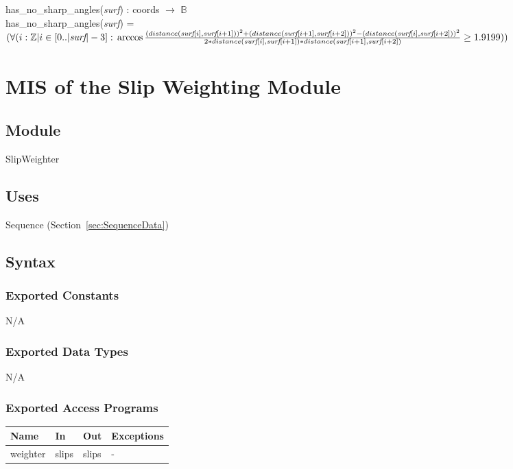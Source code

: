 \documentclass[12pt, titlepage]{article}
\begin{document}
\noindent has\_no\_sharp\_angles(\textit{surf}) : coords $\rightarrow$ 
$\mathbb{B}$\\
has\_no\_sharp\_angles(\textit{surf}) = $(\forall(i : \mathbb{Z} | i \in 
[0..|\textit{surf}|-3] :\\ \arccos \frac{(distance(\textit{surf}[i], 
\textit{surf}[i+1]))^2 + (distance(\textit{surf}[i+1], \textit{surf}[i+2]))^2 - 
(distance(\textit{surf}[i],  
\textit{surf}[i+2]))^2}{2*distance(\textit{surf}[i], 
\textit{surf}[i+1])*distance(\textit{surf}[i+1], \textit{surf}[i+2])} \geq 
1.9199))$\\

\newpage
\section{MIS of the Slip Weighting
	Module} \label{sec:WeightMod}

\subsection{Module}
SlipWeighter

\subsection{Uses}
Sequence (Section~\ref{sec:SequenceData})

\subsection{Syntax}

\subsubsection{Exported Constants}
N/A

\subsubsection{Exported Data Types}
N/A

\subsubsection{Exported Access Programs}

\begin{center}
	\renewcommand*{\arraystretch}{1.5}
	\begin{tabular} {p{}  p{}  p{} 
			p{} } \hline 
		\textbf{Name} & \textbf{In} & \textbf{Out} & \textbf{Exceptions} \\ 
		\hline
		
		weighter & slips & slips & - \\ \hline
	\end{tabular}
\end{center}
\end{document}
